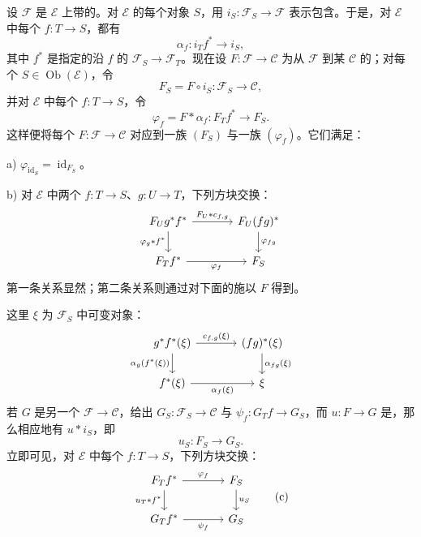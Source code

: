 设 $\mathcal F$ 是 $\mathcal E$ 上带的。对 $\mathcal E$ 的每个对象 $S$，用 $i_S:\mathcal F_S\to\mathcal F$ 表示包含。于是，对 $\mathcal E$ 中每个 $f:T\to S$，都有
\[
 \alpha_f:i_Tf^*\longrightarrow i_S,
\]
其中 $f^*$ 是指定的沿 $f$ 的 $\mathcal F_S\to\mathcal F_T$。现在设 $F:\mathcal F\to\mathcal C$ 为从 $\mathcal F$ 到某 $\mathcal C$ 的；对每个 $S\in\operatorname{Ob}(\mathcal E)$，令
\[
 F_S=F\circ i_S:\mathcal F_S\longrightarrow\mathcal C,
\]
并对 $\mathcal E$ 中每个 $f:T\to S$，令
\[
 \varphi_f=F*\alpha_f:F_Tf^*\longrightarrow F_S.
\]
这样便将每个 $F:\mathcal F\to\mathcal C$ 对应到一族 $(F_S)$ 与一族 $(\varphi_f)$。它们满足：

a) $\varphi_{\operatorname{id}_S}=\operatorname{id}_{F_S}$。

b) 对 $\mathcal E$ 中两个 $f:T\to S$、$g:U\to T$，下列方块交换：
\[
\begin{tikzcd}[column sep=large]
 F_Ug^*f^*\arrow[r,"{F_U*c_{f,g}}"]\arrow[d,"\varphi_g*f^*"']&
 F_U(fg)^*\arrow[d,"\varphi_{fg}"]\\
 F_Tf^*\arrow[r,"\varphi_f"']&F_S
\end{tikzcd}
\]
第一条关系显然；第二条关系则通过对下面的施以 $F$ 得到。

这里 $\xi$ 为 $\mathcal F_S$ 中可变对象：
\[
\begin{tikzcd}[column sep=large]
 g^*f^*(\xi)\arrow[r,"{c_{f,g}(\xi)}"]\arrow[d,"\alpha_g(f^*(\xi))"']&
 (fg)^*(\xi)\arrow[d,"\alpha_{fg}(\xi)"]\\
 f^*(\xi)\arrow[r,"\alpha_f(\xi)"']&\xi
\end{tikzcd}
\]
若 $G$ 是另一个 $\mathcal F\to\mathcal C$，给出 $G_S:\mathcal F_S\to\mathcal C$ 与 $\psi_f:G_Tf\to G_S$，而 $u:F\to G$ 是，那么相应地有 $u*i_S$，即
\[
 u_S:F_S\longrightarrow G_S.
\]
立即可见，对 $\mathcal E$ 中每个 $f:T\to S$，下列方块交换：
\[
\begin{tikzcd}[column sep=large]
 F_Tf^*\arrow[r,"\varphi_f"]\arrow[d,"u_T*f^*"']&F_S\arrow[d,"u_S"]\\
 G_Tf^*\arrow[r,"\psi_f"']&G_S
\end{tikzcd}\tag{c}
\]

